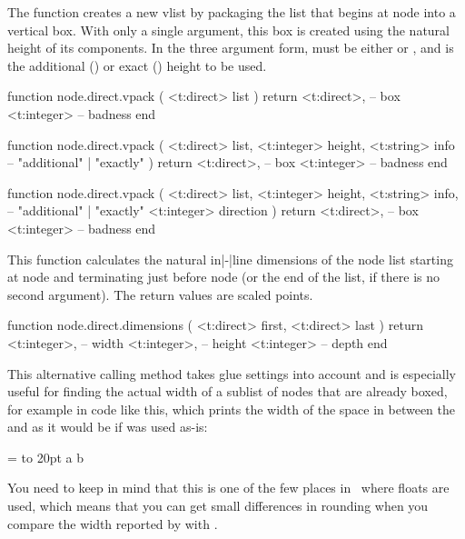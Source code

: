 The  function creates a new vlist by packaging the list that begins
at node  into a vertical box. With only a single argument, this box is
created using the natural height of its components. In the three argument form,
 must be either  or , and 
is the additional () or exact () height to be
used.

\starttyping[option=LUA]
function node.direct.vpack (
    <t:direct> list
)
    return
        <t:direct>, -- box
        <t:integer> -- badness
end

function node.direct.vpack (
    <t:direct>  list,
    <t:integer> height,
    <t:string>  info -- "additional" | "exactly"
)
    return
        <t:direct>, -- box
        <t:integer> -- badness
end

function node.direct.vpack (
    <t:direct>  list,
    <t:integer> height,
    <t:string>  info, -- "additional" | "exactly"
    <t:integer> direction
)
    return
        <t:direct>, -- box
        <t:integer> -- badness
end
\stoptyping

This function calculates the natural in|-|line dimensions of the node list starting
at node  and terminating just before node  (or the end of the
list, if there is no second argument). The return values are scaled points.

\starttyping[option=LUA]
function node.direct.dimensions (
    <t:direct> first,
    <t:direct> last
)
    return
        <t:integer>, -- width
        <t:integer>, -- height
        <t:integer>  -- depth
end
\stoptyping

This alternative calling method takes glue settings into account and is especially useful for
finding the actual width of a sublist of nodes that are already boxed, for
example in code like this, which prints the width of the space in between the
 and  as it would be if  was used as-is:

\starttyping
{} = \hbox to 20pt {a b}

\stoptyping

You need to keep in mind that this is one of the few places in \TEX\ where floats
are used, which means that you can get small differences in rounding when you
compare the width reported by  with .

